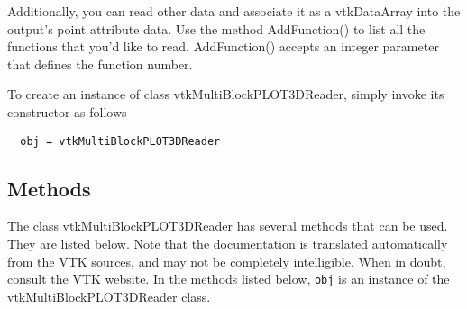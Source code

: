  Additionally, you can read other data and associate it as a vtkDataArray
 into the output's point attribute data. Use the method AddFunction()
 to list all the functions that you'd like to read. AddFunction() accepts
 an integer parameter that defines the function number.


To create an instance of class vtkMultiBlockPLOT3DReader, simply
invoke its constructor as follows
\begin{verbatim}
  obj = vtkMultiBlockPLOT3DReader
\end{verbatim}
\subsection{Methods}

The class vtkMultiBlockPLOT3DReader has several methods that can be used.
  They are listed below.
Note that the documentation is translated automatically from the VTK sources,
and may not be completely intelligible.  When in doubt, consult the VTK website.
In the methods listed below, \verb|obj| is an instance of the vtkMultiBlockPLOT3DReader class.
